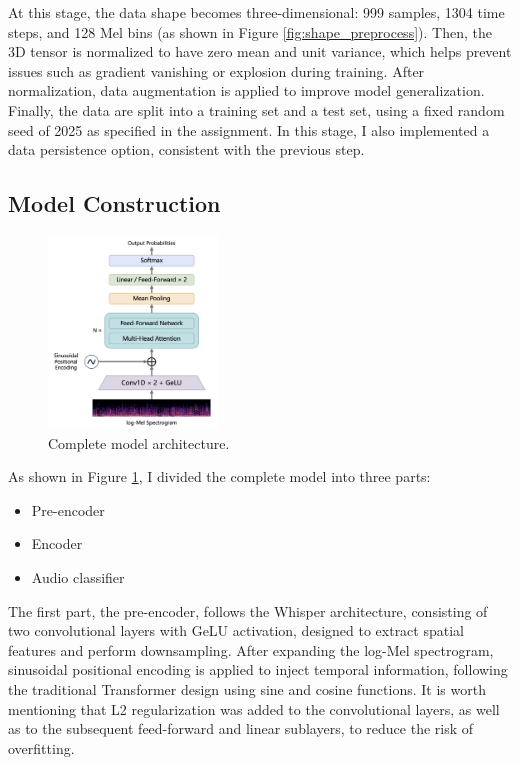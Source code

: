 \documentclass{article}
\begin{document}
      At this stage, the data shape becomes three-dimensional: 999 samples, 1304 time steps, and 128 Mel bins (as shown in Figure \ref{fig:shape_preprocess}). Then, the 3D tensor is normalized to have zero mean and unit variance, which helps prevent issues such as gradient vanishing or explosion during training. After normalization, data augmentation is applied to improve model generalization. Finally, the data are split into a training set and a test set, using a fixed random seed of 2025 as specified in the assignment. In this stage, I also implemented a data persistence option, consistent with the previous step.

    \subsection{Model Construction}

      \begin{figure}[H]
        \centering
        \includegraphics[width=0.4\textwidth]{figures/architecture.png}
        \caption{Complete model architecture.}
        \label{fig:model_architecture}
      \end{figure}

      As shown in Figure \ref{fig:model_architecture}, I divided the complete model into three parts:

      \begin{itemize}
        \item Pre-encoder
        \item Encoder
        \item Audio classifier
      \end{itemize}

      The first part, the pre-encoder, follows the Whisper architecture, consisting of two convolutional layers with GeLU activation, designed to extract spatial features and perform downsampling. After expanding the log-Mel spectrogram, sinusoidal positional encoding is applied to inject temporal information, following the traditional Transformer design using sine and cosine functions. It is worth mentioning that L2 regularization was added to the convolutional layers, as well as to the subsequent feed-forward and linear sublayers, to reduce the risk of overfitting.
\end{document}
